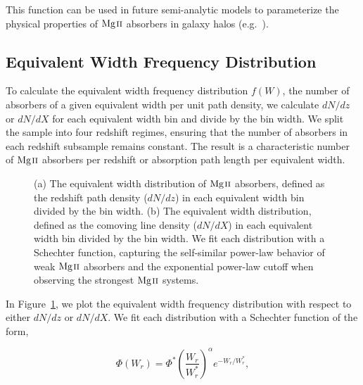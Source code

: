 \documentclass[iop,apj,numberedappendix,appendixfloats,twocolappendix]{emulateapj}
\begin{document}
\noindent This function can be used in future semi-analytic models to parameterize the physical properties of ${\hbox{{\rm Mg}\kern 0.1em{\sc ii}}}$ absorbers in galaxy halos (e.g.~\cite{Shattow2015}).

\subsection{Equivalent Width Frequency Distribution}
\label{sec:ewdistro}

To calculate the equivalent width frequency distribution $f(W)$, the number of absorbers of a given equivalent width per unit path density, we calculate $dN\!/dz$ or $dN\!/dX$ for each equivalent width bin and divide by the bin width. We split the sample into four redshift regimes, ensuring that the number of absorbers in each redshift subsample remains constant. The result is a characteristic number of ${\hbox{{\rm Mg}\kern 0.1em{\sc ii}}}$ absorbers per redshift or absorption path length per equivalent width.

\begin{figure*}[bth]
\caption{(a) The equivalent width distribution of ${\hbox{{\rm Mg}\kern 0.1em{\sc ii}}}$ absorbers, defined as the redshift path density ($dN\!/dz$) in each equivalent width bin divided by the bin width. (b) The equivalent width distribution, defined as the comoving line density ($dN\!/dX$) in each equivalent width bin divided by the bin width. We fit each distribution with a Schechter function, capturing the self-similar power-law behavior of weak ${\hbox{{\rm Mg}\kern 0.1em{\sc ii}}}$ absorbers and the exponential power-law cutoff when observing the strongest ${\hbox{{\rm Mg}\kern 0.1em{\sc ii}}}$ systems.}
\label{fig:ewdistro}
\end{figure*}

In Figure~\ref{fig:ewdistro}, we plot the equivalent width frequency distribution with respect to either $dN\!/dz$ or $dN\!/dX$. We fit each distribution with a Schechter function of the form,

\begin{equation}
\Phi (W_r) = \Phi^* \left(\frac{W_r}{W_r^*}\right)^{\alpha} e^{-W_r / W_r^*} ,
\label{eqn:schechter}
\end{equation}
\end{document}
